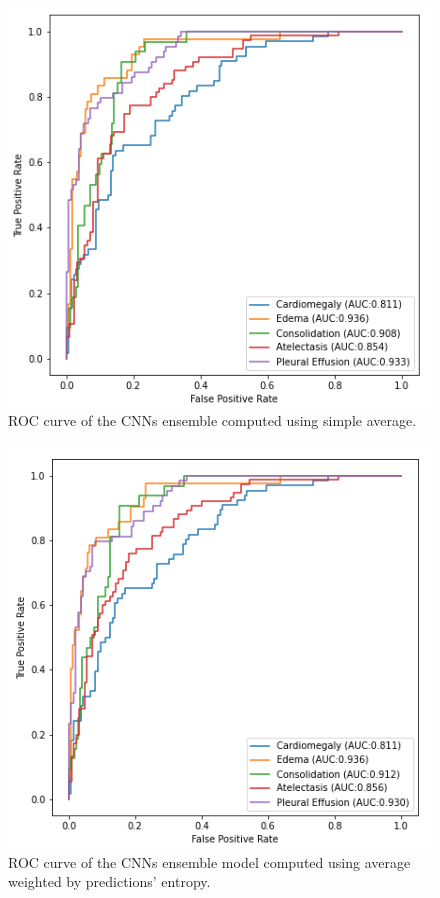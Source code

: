 \begin{figure}[htbp!]
    \centering
    \includegraphics[scale=0.55]{Tesi/images/Results/nn_average.png}
    \caption[ROC curve for CNN average ensemble]{ROC curve of the \acp{CNN} ensemble  computed using simple average.}
    \label{fig:figure_5.5}
\end{figure}

\begin{figure}[htbp!]
    \centering
    \includegraphics[scale=0.55]{Tesi/images/Results/nn_average_entropy.png}
    \caption[ROC curve for CNN weighted average ensemble]{ROC curve of the \acp{CNN} ensemble model computed using average weighted by predictions' entropy.}
    \label{fig:figure_5.6}
\end{figure}

